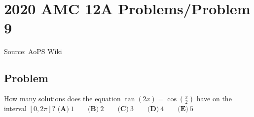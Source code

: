 \documentclass[12pt]{article}
\begin{document}
\section*{{2020 AMC 12A Problems/Problem 9}}
Source: AoPS Wiki

\subsection*{Problem}
How many solutions does the equation $\tan(2x)=\cos(\tfrac{x}{2})$ have on the interval $[0,2\pi]?$ $\textbf{(A)}\ 1\qquad\textbf{(B)}\ 2\qquad\textbf{(C)}\ 3\qquad\textbf{(D)}\ 4\qquad\textbf{(E)}\ 5$
\end{document}
